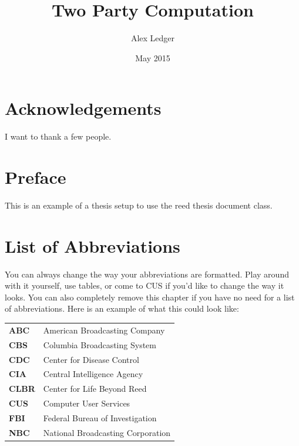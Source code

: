 \documentclass[12pt,twoside]{reedthesis}
\title{Two Party Computation}
\author{Alex Ledger}
\date{May 2015}
\begin{document}
  \maketitle
  \frontmatter %
  \pagestyle{empty} %

    \chapter*{Acknowledgements}
	I want to thank a few people.

\chapter*{Preface}
This is an example of a thesis setup to use the reed thesis document class.



\chapter*{List of Abbreviations}
	You can always change the way your abbreviations are formatted. Play around with it yourself, use tables, or come to CUS if you'd like to change the way it looks. You can also completely remove this chapter if you have no need for a list of abbreviations. Here is an example of what this could look like:

\begin{table}[h]
\centering %
\begin{tabular}{ll}
	\textbf{ABC}  	&  American Broadcasting Company \\
	\textbf{CBS}  	&  Columbia Broadcasting System\\
	\textbf{CDC}  	&  Center for Disease Control \\
	\textbf{CIA}  	&  Central Intelligence Agency\\
	\textbf{CLBR} 	&  Center for Life Beyond Reed\\
	\textbf{CUS}  	&  Computer User Services\\
	\textbf{FBI}  	&  Federal Bureau of Investigation\\
	\textbf{NBC}  	&  National Broadcasting Corporation\\
\end{tabular}
\end{table}
	
\end{document}
